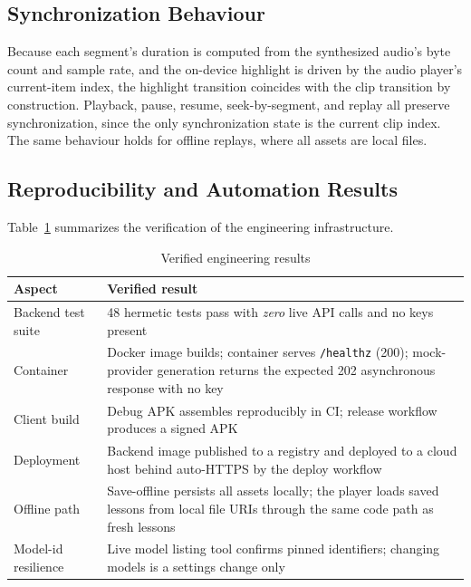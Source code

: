 \subsection{Synchronization Behaviour}

Because each segment's duration is computed from the synthesized audio's
byte count and sample rate, and the on-device highlight is driven by the
audio player's current-item index, the highlight transition coincides with
the clip transition by construction. Playback, pause, resume,
seek-by-segment, and replay all preserve synchronization, since the only
synchronization state is the current clip index. The same behaviour holds
for offline replays, where all assets are local files.

\subsection{Reproducibility and Automation Results}

Table~\ref{tab:verified} summarizes the verification of the engineering
infrastructure.

\begin{table}[htbp]
\caption{Verified engineering results}
\label{tab:verified}
\centering
\small
\renewcommand{\arraystretch}{1.3}
\begin{tabular}{@{}p{}p{}@{}}
\toprule
\textbf{Aspect} & \textbf{Verified result}\\
\midrule
Backend test suite & 48 hermetic tests pass with \emph{zero} live API calls
and no keys present\\
Container & Docker image builds; container serves \texttt{/healthz} (200);
mock-provider generation returns the expected 202 asynchronous response with
no key\\
Client build & Debug APK assembles reproducibly in CI; release workflow
produces a signed APK\\
Deployment & Backend image published to a registry and deployed to a cloud
host behind auto-HTTPS by the deploy workflow\\
Offline path & Save-offline persists all assets locally; the player loads
saved lessons from local file URIs through the same code path as fresh
lessons\\
Model-id resilience & Live model listing tool confirms pinned identifiers;
changing models is a settings change only\\
\bottomrule
\end{tabular}
\end{table}

